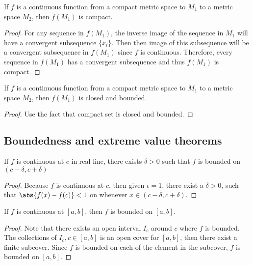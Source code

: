 \begin{refsection}
\begin{lemma}
	\cite[152]{johnsonbaugh2010foundations} If $f$ is a continuous function from a compact metric space to $M_1$ to a metric space $M_2$, then $f(M_1)$ is compact.
\end{lemma}
\begin{proof}
	For any sequence in $f(M_1)$, the inverse image of the sequence in $M_1$ will have a convergent subsequence $\{x_i\}$. Then then image of this subsequence will be a convergent subsequence in $f(M_1)$ since $f$ is continuous. Therefore, every sequence in $f(M_1)$ has a convergent subsequence and thus $f(M_1)$ is compact.
\end{proof}

\begin{corollary}
	If $f$ is a continuous function from a compact metric space to $M_1$ to a metric space $M_2$, then $f(M_1)$ is closed and bounded.
\end{corollary}
\begin{proof}
	Use the fact that compact set is closed and bounded.
\end{proof}



\subsection{Boundedness and extreme value theorems}
\begin{lemma}
	If $f$ is continuous at $c$ in real line, there exists $\delta > 0$ such that $f$ is bounded on $(c-\delta,c+\delta)$
\end{lemma}
\begin{proof}
	Because $f$ is continuous at $c$, then given $\epsilon = 1$, there exist a $\delta > 0$, such that $\abs{f(x)-f(c)} < 1$ on whenever $x\in (c-\delta,c+\delta)$.	
\end{proof}


\begin{theorem}\label{ch:calculus:th:boundednesscontinuousfunctiononclosedinterval}
	\cite[114]{johnsonbaugh2010foundations}If $f$ is continuous at $[a,b]$, then $f$ is bounded on $[a,b]$.  
\end{theorem}
\begin{proof}
	Note that there exists an open interval $I_c$ around $c$ where $f$ is bounded. The collections of $I_c,c\in [a,b]$ is an open cover for $[a,b]$, then there exist a finite subcover. Since $f$ is bounded on each of the element in the subcover, $f$ is bounded on $[a,b]$.
\end{proof}



\end{refsection}
